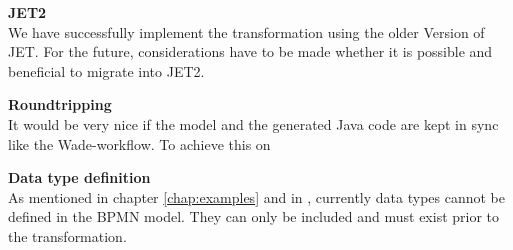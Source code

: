 \textbf{JET2}\\
We have successfully implement the transformation using the older Version of JET. For the future, considerations have to be made whether it is possible and beneficial to migrate into JET2. 

\textbf{Roundtripping}\\
It would be very nice if the model and the generated Java code are kept in sync like the Wade-workflow. To achieve this on

\textbf{Data type definition}\\
As mentioned in chapter \ref{chap:examples} and in \cite{TKMLAH2010}, currently data types cannot be defined in the BPMN model. They can only be included and must exist prior to the transformation. 
